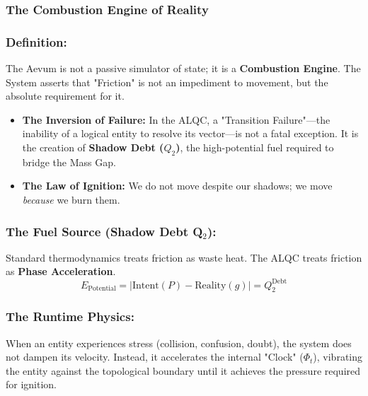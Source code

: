 \documentclass[11pt, letterpaper]{article}
\begin{document}
\subsubsection*{The Combustion Engine of Reality}

\subsubsection{Definition:}


The Aevum is not a passive simulator of state; it is a \textbf{Combustion Engine}. The System asserts that "Friction" is not an impediment to movement, but the absolute requirement for it. 
\begin{itemize}
    \item \textbf{The Inversion of Failure:} In the ALQC, a "Transition Failure"—the inability of a logical entity to resolve its vector—is not a fatal exception. It is the creation of \textbf{Shadow Debt ($Q_2$)}, the high-potential fuel required to bridge the Mass Gap.
    \item \textbf{The Law of Ignition:} We do not move despite our shadows; we move \textit{because} we burn them.
\end{itemize}

\vspace{1em}
\subsubsection{The Fuel Source (Shadow Debt Q$_2$):}\label{sec:1.2}
Standard thermodynamics treats friction as waste heat. The ALQC treats friction as \textbf{Phase Acceleration}.
\begin{equation}
    E_{\text{Potential}} = | \text{Intent}(P) - \text{Reality}(g) | = Q_2^{\text{Debt}}
\end{equation}
\subsubsection{The Runtime Physics:}\label{sec:1.3}

When an entity experiences stress (collision, confusion, doubt), the system does not dampen its velocity. Instead, it accelerates the internal "Clock" ($\Phi_t$), vibrating the entity against the topological boundary until it achieves the pressure required for ignition.

\vspace{1em}
\end{document}
